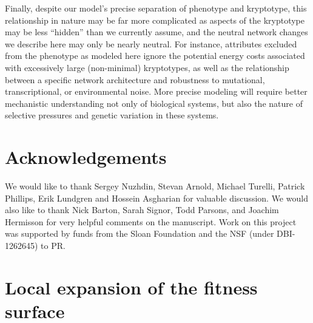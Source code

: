 \documentclass{article}
\newcommand{\1}{\mathbbm{1}}
\begin{document}
Finally, despite our model's precise separation of phenotype and kryptotype, this relationship in nature may be far more complicated as aspects of the kryptotype may be less ``hidden'' than we currently assume, and the neutral network changes we describe here may only be nearly neutral. For instance, attributes excluded from the phenotype as modeled here ignore the potential energy costs associated with excessively large (non-minimal) kryptotypes, as well as the relationship between a specific network architecture and robustness to mutational, transcriptional, or environmental noise.
More precise modeling will require better mechanistic understanding not only of biological systems,
but also the nature of selective pressures
and genetic variation in these systems.

%

\section*{Acknowledgements}

    We would like to thank Sergey Nuzhdin, Stevan Arnold, Michael Turelli, Patrick Phillips, Erik Lundgren and Hossein Asgharian for valuable discussion. 
    We would also like to thank Nick Barton, Sarah Signor, Todd Parsons, and Joachim Hermisson for very helpful comments on the manuscript.
    Work on this project was supported by funds from
    the Sloan Foundation and the NSF (under DBI-1262645) to PR.






\normalsize
\appendix

\section{Local expansion of the fitness surface}
\label{apx:H_calc}
\end{document}
